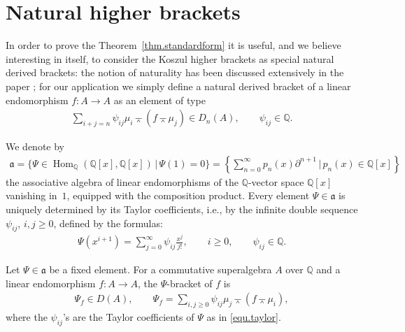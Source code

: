 \documentclass[pdftex]{sigma}
\newcommand{\wedgebar}{\barwedge}
\newcommand{\de}{\partial}
\newcommand{\Hom}{\operatorname{Hom}}
\newcommand{\Q}{\mathbb{Q}}
\numberwithin{equation}{section}
\begin{document}
\section{Natural higher brackets}
\label{sec.natural}

In order to prove the Theorem~\ref{thm.standardform} it is useful, and we believe interesting in itself, to consider the Koszul higher brackets
as special natural derived brackets: the notion of naturality has been discussed extensively in the paper \cite{markl1}; for our application we simply def\/ine a natural derived bracket of a linear endomorphism $f\colon A\to A$ as an element of type
\begin{gather*}\sum_{i+j=n}\psi_{ij} \mu_i\wedgebar (f\wedgebar\mu_j)\in D_n(A),\qquad \psi_{ij}\in \Q .\end{gather*}

We denote by
\begin{gather*}
\mathfrak{a}=\big\{\Psi\in \Hom_{\Q}(\Q[x],\Q[x])\,|\, \Psi(1)=0\big\}
=\left\{\sum_{n=0}^{\infty}p_n(x)\de^{n+1}\,|\, p_n(x)\in \Q[x]\right\}\end{gather*}
the associative algebra of linear endomorphisms of the $\Q$-vector space
$\Q[x]$ vanishing in~$1$, equipped with the composition product.
Every element $\Psi\in \mathfrak{a}$ is uniquely determined by its Taylor coef\/f\/icients,
i.e., by the inf\/inite double sequence $\psi_{ij}$, $i,j\ge 0$, def\/ined by the formulas:
\begin{gather}\label{equ.taylor}
\Psi(x^{i+1})=\sum_{j=0}^{\infty}\psi_{ij}\frac{x^j}{j!},\qquad i\ge 0,\qquad \psi_{ij}\in\Q .
\end{gather}

\begin{Definition} Let $\Psi\in \mathfrak{a}$ be a f\/ixed element.
For a commutative superalgebra $A$ over $\Q$ and a linear endomorphism $f\colon A\to A$,
the $\Psi$-bracket of $f$ is
\begin{gather*} \Psi_f\in D(A),\qquad
\Psi_f=\sum_{i,j\ge 0}\psi_{ij} \mu_j\wedgebar (f\wedgebar\mu_i),
\end{gather*}
where the $\psi_{ij}$'s are the Taylor coef\/f\/icients of $\Psi$ as in \eqref{equ.taylor}.
\end{Definition}
\end{document}
